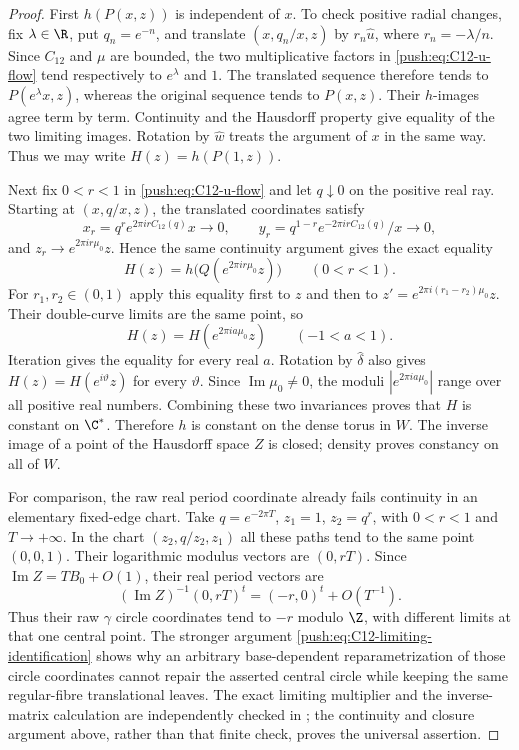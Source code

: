 \begin{proof}
First $h(P(x,z))$ is independent of $x$. To check positive
radial changes, fix $\lambda\in\R$, put $q_n=e^{-n}$, and
translate $(x,q_n/x,z)$ by
$r_n\widehat u$, where $r_n=-\lambda/n$. Since $C_{12}$ and
$\mu$ are bounded, the two multiplicative factors in
\eqref{push:eq:C12-u-flow} tend respectively to $e^\lambda$ and
$1$. The translated sequence therefore tends to $P(e^\lambda x,z)$,
whereas the original sequence tends to $P(x,z)$. Their $h$-images
agree term by term. Continuity and the Hausdorff property give
equality of the two limiting images. Rotation by
$\widehat w$ treats the argument of $x$ in the same way.
Thus we may write $H(z)=h(P(1,z))$.

Next fix $0<r<1$ in \eqref{push:eq:C12-u-flow} and let $q\downarrow0$
on the positive real ray. Starting at $(x,q/x,z)$, the translated
coordinates satisfy
\[
 x_r=q^r e^{2\pi i r C_{12}(q)}x\longrightarrow0,\qquad
 y_r=q^{1-r} e^{-2\pi i r C_{12}(q)}/x\longrightarrow0,
\]
and $z_r\longrightarrow e^{2\pi i r\mu_0}z$. Hence the same
continuity argument gives the exact equality
\begin{equation}\label{push:eq:C12-limiting-identification}
 H(z)=h\bigl(Q(e^{2\pi i r\mu_0}z)\bigr)
 \qquad(0<r<1).
\end{equation}
For $r_1,r_2\in(0,1)$ apply this equality first to $z$ and
then to $z'=e^{2\pi i(r_1-r_2)\mu_0}z$. Their double-curve
limits are the same point, so
\[
 H(z)=H(e^{2\pi i a\mu_0}z)\qquad(-1<a<1).
\]
Iteration gives the equality for every real $a$. Rotation by
$\widehat\delta$ also gives $H(z)=H(e^{i\vartheta}z)$ for every
$\vartheta$. Since $\operatorname{Im}\mu_0\ne0$, the moduli
$|e^{2\pi i a\mu_0}|$ range over all positive real numbers.
Combining these two invariances proves that $H$ is constant on
$\C^*$. Therefore $h$ is constant on the dense torus in $W$.
The inverse image of a point of the Hausdorff space $Z$ is
closed; density proves constancy on all of $W$.

For comparison, the raw real period coordinate already fails
continuity in an elementary fixed-edge chart. Take
$q=e^{-2\pi T}$, $z_1=1$, $z_2=q^r$, with $0<r<1$ and
$T\to+\infty$. In the chart
$(z_2,q/z_2,z_1)$ all these paths tend to the same point
$(0,0,1)$. Their logarithmic modulus vectors are $(0,rT)$.
Since $\operatorname{Im}Z=TB_0+O(1)$, their real period
vectors are
\[
 (\operatorname{Im}Z)^{-1}(0,rT)^t
                  =(-r,0)^t+O(T^{-1}).
\]
Thus their raw $\gamma$ circle coordinates tend to $-r$ modulo
$\Z$, with different limits at that one central point. The
stronger argument \eqref{push:eq:C12-limiting-identification} shows
why an arbitrary base-dependent reparametrization of those
circle coordinates cannot repair the asserted central circle
while keeping the same regular-fibre translational leaves.
The exact limiting multiplier and the inverse-matrix calculation
are independently checked in
; the continuity
and closure argument above, rather than that finite check,
proves the universal assertion.
\end{proof}

